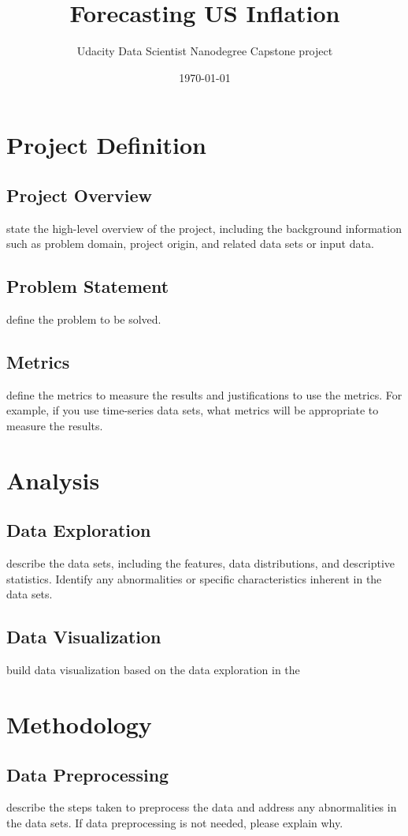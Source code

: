\documentclass[12pt]{article}
\title{Forecasting US Inflation}
\author{Udacity Data Scientist Nanodegree Capstone project}
\date{\today}
\begin{document}
\maketitle
\tableofcontents
\newpage

\section{Project Definition}
\subsection{Project Overview}
state the high-level overview of the project, including the background information such as problem domain, project origin, and related data sets or input data.
\subsection{Problem Statement}
define the problem to be solved.
\subsection{Metrics}
define the metrics to measure the results and justifications to use the metrics. For example, if you use time-series data sets, what metrics will be appropriate to measure the results.

\section{Analysis}
\subsection{Data Exploration}
describe the data sets, including the features, data distributions, and descriptive statistics. Identify any abnormalities or specific characteristics inherent in the data sets.
\subsection{Data Visualization}
 build data visualization based on the data exploration in the 

\section{Methodology}
\subsection{Data Preprocessing}
describe the steps taken to preprocess the data and address any abnormalities in the data sets. If data preprocessing is not needed, please explain why.
\end{document}
